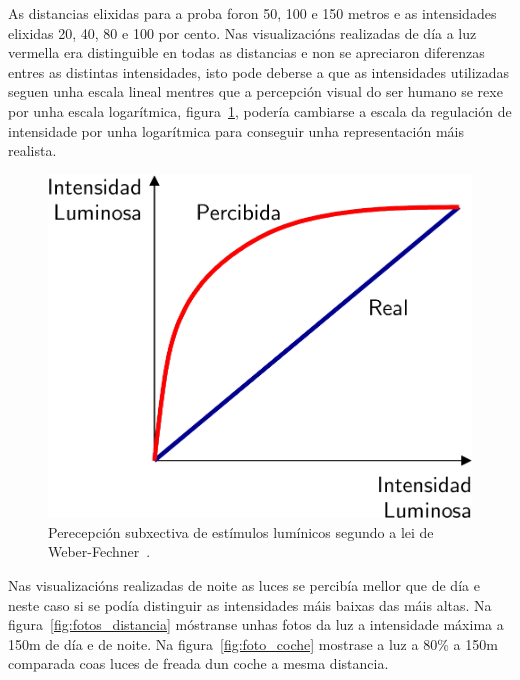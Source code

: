 As distancias elixidas para a proba foron 50, 100 e 150 metros e as intensidades elixidas 20, 40, 80 e 100 por cento.
Nas visualizacións realizadas de día a luz vermella era distinguible en todas as distancias e non se apreciaron diferenzas entres as distintas intensidades, isto pode deberse a que as intensidades utilizadas seguen unha escala lineal mentres que a percepción visual do ser humano se rexe por unha escala logarítmica, figura~\ref{fig:percepcion_luminica}, podería cambiarse a escala da regulación de intensidade por unha logarítmica para conseguir unha representación máis realista.
\begin{figure}[tbp]
  \centering
  \includegraphics[scale=0.2]{imaxes/percepcion-luminica.png}
  \caption{Perecepción subxectiva de estímulos lumínicos segundo a lei de Weber-Fechner~\cite{PercepionVisual}.}
  \label{fig:percepcion_luminica}
\end{figure}

Nas visualizacións realizadas de noite as luces se percibía mellor que de día e neste caso si se podía distinguir as intensidades máis baixas das máis altas. Na figura~\ref{fig:fotos_distancia} móstranse unhas fotos da luz a intensidade máxima a 150m de día e de noite. Na figura~\ref{fig:foto_coche} mostrase a luz a 80\(\%\) a 150m comparada coas luces de freada dun coche a mesma distancia.

